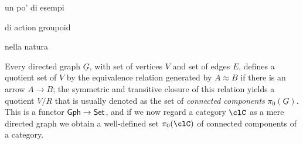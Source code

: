 \begin{example}
un po' di esempi
\end{example}
\begin{example}
di action groupoid
\end{example}
\begin{example}
nella natura
\end{example}
\begin{definition}
Every directed graph $\underline G$, with set of vertices $V$ and set of edges $E$, defines a quotient set of $V$ by the equivalence relation generated by $A\approx B$ if there is an arrow $A\to B$; the symmetric and transitive closure of this relation yields a quotient $V/R$ that is usually denoted as the set of \emph{connected components} $\pi_0(\underline G)$. This is a functor ${\sf Gph} \to \mathsf{Set}$, and if we now regard a category $\clC$ as a mere directed graph we obtain a well-defined set $\pi_0(\clC)$ of connected components of a category.
\end{definition}
